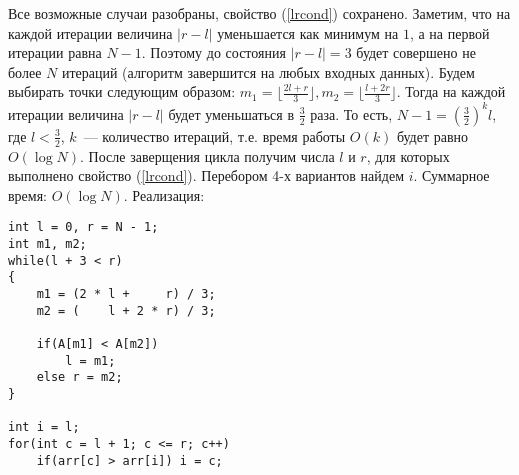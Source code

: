 \documentclass[a4paper]{article}
\begin{document}
\begin{enumerate}
Все возможные случаи разобраны, свойство (\ref{lrcond}) сохранено.\newline
Заметим, что на каждой итерации величина $|r-l|$ уменьшается как минимум на $1$, а на первой итерации равна $N-1$. Поэтому до состояния $|r-l|=3$ будет совершено не более $N$ итераций (алгоритм завершится на любых входных данных).\newline
Будем выбирать точки следующим образом: $m_1=\lfloor\frac{2l+r}{3}\rfloor,m_2=\lfloor\frac{l+2r}{3}\rfloor$. Тогда на каждой итерации величина $|r-l|$ будет уменьшаться в $\frac{3}{2}$ раза. То есть, $N-1=(\frac{3}{2})^k l$, где $l<\frac{3}{2}$, $k$~--- количество итераций, т.е. время работы $O(k)$ будет равно $O(\log N)$.\newline
После заверщения цикла получим числа $l$ и $r$, для которых выполнено свойство (\ref{lrcond}). Перебором 4-х вариантов найдем $i$.\newline
Суммарное время: $O(\log N)$.\newpage
Реализация:\begin{verbatim}
int l = 0, r = N - 1;
int m1, m2;
while(l + 3 < r)
{
    m1 = (2 * l +     r) / 3;
    m2 = (    l + 2 * r) / 3;

    if(A[m1] < A[m2])
        l = m1;
    else r = m2;
}

int i = l;
for(int c = l + 1; c <= r; c++)
    if(arr[c] > arr[i]) i = c;\end{verbatim}
\end{enumerate}
\end{document}
